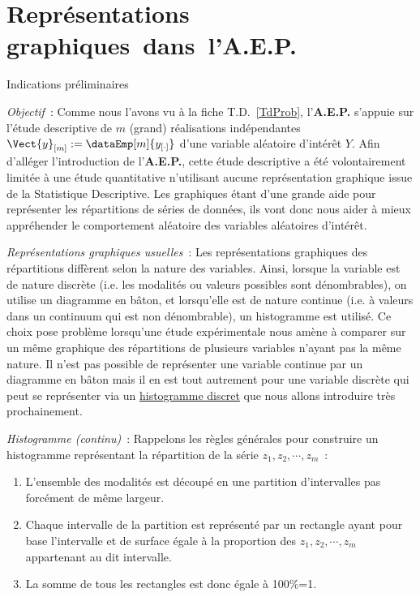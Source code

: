 \documentclass[10pt]{report}
\begin{document}
\appendix\chapter{Représentations\\graphiques~dans~l'A.E.P.}\label{TdAEPGraph}
\begin{IndicList}{Indications préliminaires} 
\item \textit{Objectif}~: Comme nous l'avons vu à la fiche T.D.~\ref{TdProb}, l'\textbf{A.E.P.} s'appuie sur l'étude descriptive de $m$ (grand) réalisations indépendantes $\Vect{y}_{[m]}:=\dataEmp[m]{y_{[\cdot]}}$ d'une variable aléatoire d'intérêt $Y$. Afin d'alléger l'introduction de l'\textbf{A.E.P.}, cette étude descriptive a été volontairement limitée à une étude quantitative n'utilisant aucune représentation graphique issue de la Statistique Descriptive. Les graphiques étant d'une grande aide pour représenter les répartitions de séries de données, ils vont donc nous aider à mieux appréhender le comportement aléatoire des variables aléatoires d'intérêt.
\item \textit{Représentations graphiques usuelles}~: Les représentations graphiques des répartitions diffèrent selon la nature des variables. Ainsi, lorsque la variable est de nature discrète (i.e. les modalités ou valeurs possibles sont dénombrables), on utilise un diagramme en bâton, et lorsqu'elle est de nature continue (i.e. à valeurs dans un continuum qui est non dénombrable), un histogramme est utilisé. Ce choix pose problème lorsqu'une étude expérimentale nous amène à comparer sur un même graphique des répartitions de plusieurs variables n'ayant pas la même nature. Il n'est pas possible de représenter une variable continue par un diagramme en bâton mais il en est tout autrement pour une variable discrète qui peut se représenter via un \underline{histogramme discret} que nous allons introduire très prochainement. 
\item \textit{Histogramme (continu)}~: Rappelons les règles générales pour construire un histogramme représentant la répartition de la série  $z_1,z_2,\cdots,z_m$~:
\begin{enumerate}
\item L'ensemble des modalités est découpé en une partition d'intervalles pas forcément de même largeur.
\item Chaque intervalle de la partition est représenté par un rectangle ayant pour base l'intervalle et de surface égale à la proportion des $z_1,z_2,\cdots,z_m$ appartenant au dit intervalle.
\item La somme de tous les rectangles est donc égale à 100\%=1.

\end{enumerate}
\end{IndicList}
\end{document}

